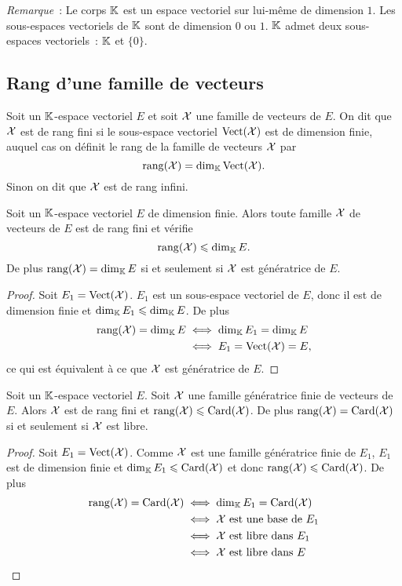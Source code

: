 \emph{Remarque}~: Le corps $\mathbb{K}$ est un espace vectoriel sur lui-même de dimension $1$. Les sous-espaces vectoriels de $\mathbb{K}$ sont de dimension $0$ ou $1$. $\mathbb{K}$ admet deux sous-espaces vectoriels~: $\mathbb{K}$ et $\{0\}$.

\subsection{Rang d'une famille de vecteurs}

\begin{defdef}
  Soit un $\mathbb{K}$-espace vectoriel $E$ et soit $\mathcal{X}$ une famille de vecteurs de $E$. On dit que $\mathcal{X}$ est de rang fini si le sous-espace vectoriel $\operatorname{Vect}(\mathcal{X})$ est de dimension finie, auquel cas on définit le rang de la famille de vecteurs $\mathcal{X}$ par
  \begin{equation}
    \operatorname{rang}(\mathcal{X})=\operatorname{dim}_{\mathbb{K}} \operatorname{Vect}(\mathcal{X}).
  \end{equation}
  Sinon on dit que $\mathcal{X}$ est de rang infini.
\end{defdef}

\begin{prop}
  Soit un $\mathbb{K}$-espace vectoriel $E$ de dimension finie. Alors toute famille $\mathcal{X}$ de vecteurs de $E$ est de rang fini et vérifie
  \begin{equation}
    \operatorname{rang}(\mathcal{X}) \leqslant \operatorname{dim}_{\mathbb{K}} E.
  \end{equation}
De plus $\operatorname{rang}(\mathcal{X}) = \operatorname{dim}_{\mathbb{K}} E$ si et seulement si $\mathcal{X}$ est génératrice de $E$.
\end{prop}
\begin{proof}
  Soit $E_1=\operatorname{Vect}(\mathcal{X})$. $E_1$ est un sous-espace vectoriel de $E$, donc il est de dimension finie et $\operatorname{dim}_{\mathbb{K}} E_1 \leqslant \operatorname{dim}_{\mathbb{K}} E$. De plus
  \begin{align}
    \operatorname{rang}(\mathcal{X}) = \operatorname{dim}_{\mathbb{K}} E &\iff \operatorname{dim}_{\mathbb{K}} E_1 = \operatorname{dim}_{\mathbb{K}} E\\
    & \iff E_1=\operatorname{Vect}(\mathcal{X})=E,
  \end{align}
  ce qui est équivalent à ce que $\mathcal{X}$ est génératrice de $E$.
\end{proof}

\begin{prop}\label{prop:caracrangbase}
   Soit un $\mathbb{K}$-espace vectoriel $E$. Soit $\mathcal{X}$ une famille génératrice finie de vecteurs de $E$. Alors $\mathcal{X}$ est de rang fini et $\operatorname{rang}(\mathcal{X}) \leqslant \operatorname{Card}(\mathcal{X})$. De plus $\operatorname{rang}(\mathcal{X})=\operatorname{Card}(\mathcal{X})$ si et seulement si $\mathcal{X}$ est libre.
\end{prop}
\begin{proof}
  Soit $E_1=\operatorname{Vect}(\mathcal{X})$. Comme $\mathcal{X}$ est une famille génératrice finie de $E_1$, $E_1$ est de dimension finie et $\operatorname{dim}_{\mathbb{K}} E_1 \leqslant \operatorname{Card}(\mathcal{X})$ et donc $\operatorname{rang}(\mathcal{X}) \leqslant \operatorname{Card}(\mathcal{X})$. De plus 
  \begin{align}
    \operatorname{rang}(\mathcal{X}) = \operatorname{Card}(\mathcal{X}) &\iff \operatorname{dim}_{\mathbb{K}} E_1 = \operatorname{Card}(\mathcal{X})\\
    &\iff \mathcal{X} \text{~est une base de } E_1\\
    &\iff \mathcal{X} \text{~est libre dans } E_1\\
    &\iff \mathcal{X} \text{~est libre dans } E\\
  \end{align}
\end{proof}


